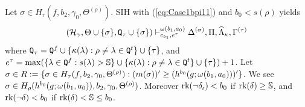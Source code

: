 \documentclass{article}
\newcommand{\mS}{\mathbb{S}}
\begin{document}
Let $\sigma\in H_{\tau}(f,b_{2},\gamma_{0},\Theta^{(\rho)})$.
SIH with (\ref{eq:Case1bpi11}) and $b_{0}<s(\rho)$
yields 
\begin{equation}\label{eq:Case1epi11}
(\mathcal{H}_{\gamma},\Theta\cup\{\sigma\},
{\tt Q}_{\tau}\cup\{\sigma\}
)
\vdash^{\omega(b_{1},a_{0})}_{c_{b_{1}},e^{\tau}}
\Delta^{(\sigma)},\Pi,\widehat{\Lambda}_{\kappa},\Gamma^{(\tau)}
\end{equation}
where
${\tt Q}_{\tau}={\tt Q}^{f}\cup\{\kappa(\lambda):\rho\neq\lambda\in{\tt Q}^{t}\}\cup\{\tau\}$, and
$e^{\tau}=\max(\{\lam\in{\tt Q}^{f} : s(\lam)>\mS\}\cup\{\kap(\lam): \rho\neq\lam\in{\tt Q}^{t}\}\cup\{\tau\})+1$.
Let
$\sigma\in R
:=\{\sigma\in  H_{\tau}(f,b_{2}, \gamma_{0},\Theta^{(\rho)}): 
(m(\sigma))^{\prime}\geq (h^{b_{0}}(g;\omega(b_{1},a_{0})))^{\prime}
\}
$.
We see $\sigma\in H_{\rho}(h^{b_{0}}(g;\omega(b_{1},a_{0})),b_{2},\gamma_{0},\Theta^{(\rho)})$.
Moreover $\mbox{{\rm rk}}(\lnot\delta_{\iota})<b_{0}$ if $\rk(\del)\geq\mS$, and
$\mbox{{\rm rk}}(\lnot\delta)<b_{0}$ if $\rk(\del)<\mS\leq b_{0}$.
\end{document}

